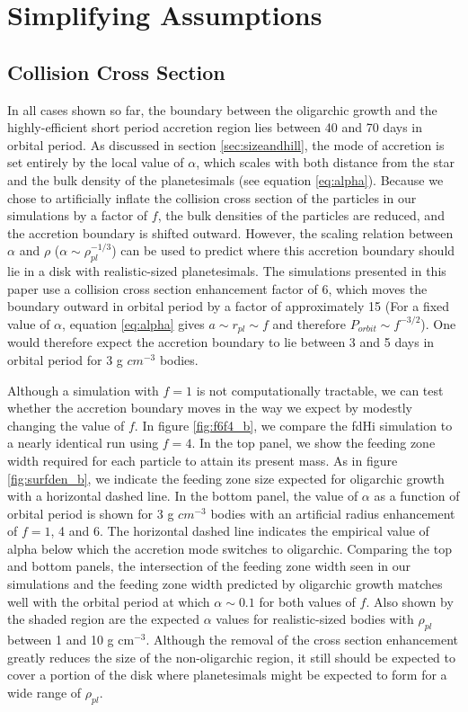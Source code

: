 \section{Simplifying Assumptions}\label{sec:assump}

\subsection{Collision Cross Section}

In all cases shown so far, the boundary between the
oligarchic growth and the highly-efficient short period accretion
region lies between 40 and 70 days in orbital period. As discussed in section \ref{sec:sizeandhill}, the mode of accretion is
set entirely by the local value of $\alpha$, which scales with both
distance from the star and the bulk density of the planetesimals (see
equation \ref{eq:alpha}). Because we chose to artificially inflate the
collision cross section of the particles in our simulations by a factor of $f$, the bulk densities
of the particles are reduced, and the accretion boundary is shifted outward.
However, the scaling relation between $\alpha$ and $\rho$ ($\alpha \sim \rho_{pl}^{-1/3}$) can be used
to predict where this accretion boundary should lie in a disk with realistic-sized planetesimals. The simulations
presented in this paper use a collision cross section enhancement factor of 6, which moves the boundary outward in orbital
period by a factor of approximately 15 (For a fixed value of $\alpha$, equation \ref{eq:alpha} gives $a \sim r_{pl} \sim f$ and therefore $P_{orbit} \sim f^{-3/2}$). One would therefore expect the accretion boundary to lie between 3 and 5 days in orbital period
for 3 g $cm^{-3}$ bodies.

Although a simulation with $f=1$ is not computationally tractable, we
can test whether the accretion boundary moves in the way we expect by
modestly changing the value of $f$. In figure \ref{fig:f6f4_b}, we
compare the fdHi simulation to a nearly identical run using $f=4$. In
the top panel, we show the feeding zone width required for each particle to
attain its present mass. As in figure \ref{fig:surfden_b}, we indicate the feeding
zone size expected for oligarchic growth with a horizontal dashed line. In the bottom panel, the value
of $\alpha$ as a function of orbital period is shown for 3 g $cm^{-3}$
bodies with an artificial radius enhancement of $f=1$, 4 and 6. The
horizontal dashed line indicates the empirical value of alpha below which the
accretion mode switches to oligarchic. Comparing the top and
bottom panels, the intersection of the feeding zone width seen in our simulations and the
feeding zone width predicted by oligarchic growth matches well with the orbital period at which $\alpha
\sim 0.1$ for both values of $f$.  Also shown by the shaded region are the expected $\alpha$ values for
realistic-sized bodies with $\rho_{pl}$ between 1 and 10 g cm$^{-3}$. Although the removal of the cross section
enhancement greatly reduces the size of the non-oligarchic region, it still should be expected to cover a portion of the
disk where planetesimals might be expected to form \cite{mulders18} for a wide range of $\rho_{pl}$.

